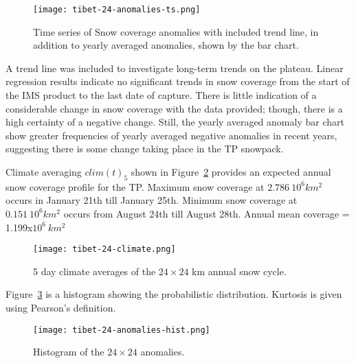 \begin{figure}[ht]
\centering
\begin{minipage}{6in}
\texttt{[image: tibet-24-anomalies-ts.png]}
\caption{Time series of Snow coverage anomalies with included trend line, in addition to yearly averaged anomalies, shown by the bar chart.}
\label{anomalies}
\end{minipage}
\end{figure}

A trend line was included to investigate long-term trends on the plateau. Linear regression results indicate no significant trends in snow coverage from the start of the IMS product to the last date of capture. There is little indication of a considerable change in snow coverage with the data provided; though, there is a high certainty of a negative change. Still, the yearly averaged anomaly bar chart show greater frequencies of yearly averaged negative anomalies in recent years, suggesting there is some change taking place in the TP snowpack.

Climate averaging $clim(t)_{5}$ shown in Figure~\ref{fig:clim} provides an expected annual snow coverage profile for the TP. Maximum snow coverage at $2.786 \ 10^{6} km^{2}$ occurs in January 21th till January 25th. Minimum snow coverage at $0.151 \ 10^{6} km^{2}$ occurs from August 24th till August 28th. Annual mean coverage = 1.199x$10^6\ km^2$

\begin{figure}[ht]
\centering
\begin{minipage}{3in}
\texttt{[image: tibet-24-climate.png]}
\caption{5 day climate averages of the $24 \times 24$ km annual snow cycle.}
\label{fig:clim}
\end{minipage}
\end{figure}

Figure~\ref{fig:hist} is a histogram showing the probabilistic distribution. Kurtosis is given using Pearson's definition. \cite{kokoska2000standard}

\begin{figure}[ht]
\centering
\begin{minipage}{3in}
\texttt{[image: tibet-24-anomalies-hist.png]}
\caption{Histogram of the $24 \times 24$ anomalies.}
\label{fig:hist}
\end{minipage}
\end{figure}

